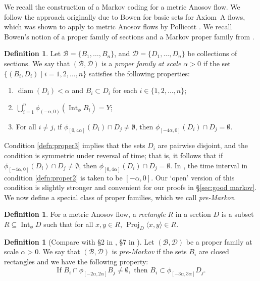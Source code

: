 \documentclass[JEP,XML,SOM,Unicode,NoFloatCountersInSection]{cedram}
\let\mathcal\mathscr
\let\sep\mid
\theoremstyle{definition}
\newtheorem{defn}[thm]{Definition}
\numberwithin{equation}{section}
\DeclareMathOperator{\diam}{diam}
\DeclareMathOperator{\Int}{Int}
\DeclareMathOperator{\Proj}{Proj}
\newcommand\DDD{\mathcal D}
\newcommand\BBB{\mathcal B}
\begin{document}
We recall the construction of a Markov coding for a metric Anosov flow. We follow the approach originally due to Bowen \cite{bowen-symbolic} for basic sets for Axiom~A flows, which was shown to apply to metric Anosov flows by Pollicott \cite{pollicott}. We recall Bowen's notion of a proper family of sections and a Markov proper family from \cite{bowen-symbolic}.

\begin{defn}\label{defn:proper}
Let $\BBB=\{B_1, \ldots, B_n\}$, and $\DDD=\{D_1, \ldots, D_n\}$ be collections of sections. We say that $(\BBB, \DDD)$ is a \emph{proper family at scale $\alpha>0$} if the set \hbox{$\{ (B_i, D_i) \sep i = 1, 2, \ldots, n \}$} satisfies the following properties:
\begin{enumerate}
\item\label{defn:proper1} $\diam(D_i)< \alpha$ and $B_i \subset D_i$ for each $i \in \{1, 2, \ldots, n\}$;
\item\label{defn:proper2} $\bigcup_{i=1}^n\phi_{(-\alpha, 0)} (\Int_\phi B_i)=Y$;
\item\label{defn:proper3} For all $i\neq j$, if $\phi_{[0, 4\alpha]}(D_i) \cap D_j \neq \emptyset$, then $\phi_{[-4\alpha, 0]}(D_i) \cap D_j = \emptyset$.
\end{enumerate}
\end{defn}

Condition \eqref{defn:proper3} implies that the sets $D_i$ are pairwise disjoint, and the condition is symmetric under reversal of time; that is, it follows that if $\phi_{[-4\alpha, 0]}(D_i) \cap D_j \neq \emptyset$, then $\phi_{[0, 4\alpha]}(D_i) \cap D_j = \emptyset$. In \cite{bowen-symbolic, pollicott}, the time interval in condition \eqref{defn:proper2} is taken to be $[-\alpha, 0]$. Our `open' version of this condition is slightly stronger and convenient for our proofs in \S\ref {sec:good markov}. We now define a special class of proper families, which we call \emph{pre-Markov}.

\begin{defn}\label{def:rectangle}
For a metric Anosov flow, a \emph{rectangle} $R$ in a section $D$ is a subset $R \subseteq \Int_\phi D$ such that for all $x,y \in R$, $\Proj_{D} \langle x,y\rangle \in R$.
\end{defn}

\begin{defn}[Compare with \S 2 in \cite{pollicott}, \S 7 in \cite{bowen-symbolic}]\label{defn:pollicott}
Let $(\BBB, \DDD)$ be a proper family at scale $\alpha>0$. We say that $(\BBB, \DDD)$ is \emph{pre-Markov} if the sets $B_i$ are closed rectangles and we have the following property:
\begin{equation} \label{premarkov}
\mbox{If }B_i \cap \phi_{[-2 \alpha, 2 \alpha]}B_j \neq \emptyset, \mbox{ then } B_i \subset \phi_{[-3\alpha, 3\alpha]} D_j.
\end{equation}
\end{defn}
\end{document}
